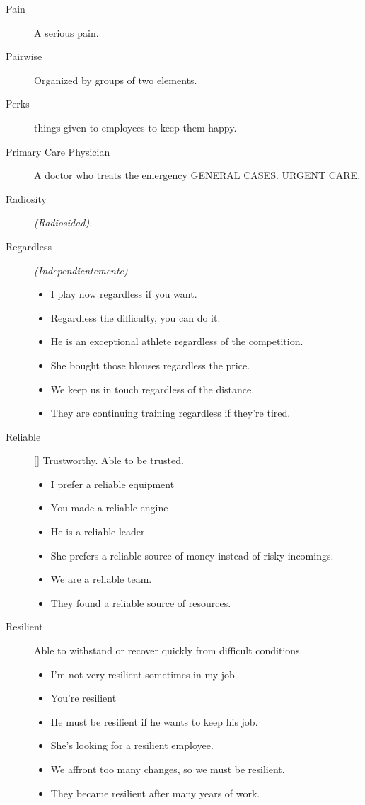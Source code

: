 \begin{multicols}{2}
\begin{description}
\item[Pain] A serious pain.

\item[Pairwise] Organized by groups of two elements.

\item[Perks] things given to employees to keep them happy.

\item[Primary Care Physician] A doctor who treats the emergency GENERAL CASES. URGENT CARE.

\item[Radiosity] \emph{(Radiosidad)}.

\item[Regardless] \emph{(Independientemente)}
\begin{itemize}
\item I play now regardless if you want.
\item Regardless the difficulty, you can do it.
\item He is an exceptional athlete regardless of the competition.
\item She bought those blouses regardless the price.
\item We keep us in touch regardless of the distance.
\item They are continuing training regardless if they're tired.
\end{itemize}

\item[Reliable] [\emph{}] Trustworthy. Able to be trusted.
\begin{itemize}
\item I prefer a reliable equipment
\item You made a reliable engine
\item He is a reliable leader
\item She prefers a reliable source of money instead of risky incomings.
\item We are a reliable team.
\item They found a reliable source of resources.
\end{itemize}

\item[Resilient] Able to withstand or recover quickly from difficult conditions.
\begin{itemize}
\item I'm not very resilient sometimes in my job.
\item You're resilient 
\item He must be resilient if he wants to keep his job.
\item She's looking for a resilient employee.
\item We affront too many changes, so we must be resilient.
\item They became resilient after many years of work.
\end{itemize}


\end{description}
\end{multicols}
